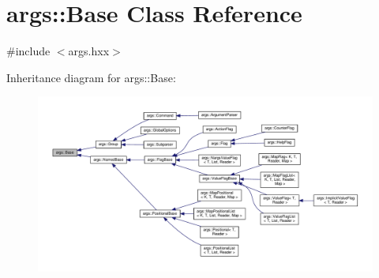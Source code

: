 \hypertarget{classargs_1_1_base}{}\section{args\+:\+:Base Class Reference}
\label{classargs_1_1_base}


{\ttfamily \#include $<$args.\+hxx$>$}



Inheritance diagram for args\+:\+:Base\+:\nopagebreak
\begin{figure}[H]
\begin{center}
\leavevmode
\includegraphics[width=350pt]{classargs_1_1_base__inherit__graph}
\end{center}
\end{figure}

